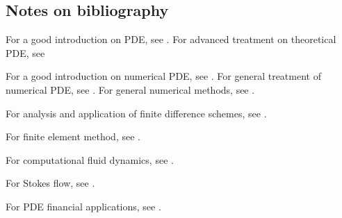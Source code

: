 \begin{refsection}
\fi
\section{Notes on bibliography}

For a good introduction on PDE, see \cite{strauss1992partial}. For advanced treatment on theoretical PDE, see

For a good introduction on numerical PDE, see \cite{holmes2007introduction}.
For general treatment of numerical PDE, see \cite{larsson2008partial}\cite{griffiths2015essential}\cite{leveque2007finite}.
For general numerical methods, see \cite{sauer2012numerical}.

For analysis and application of finite difference schemes, see \cite{strikwerda2004finite}\cite{leveque2007finite}\cite{karniadakis2003parallel}.
 
For finite element method, see \cite{bickford1990first}\cite{larson2013finite}.

For computational fluid dynamics, see \cite{zikanov2010essential}.

For Stokes flow, see \cite{barthes2012microhydrodynamics}.

For PDE financial applications, see \cite{zhu2004derivative}\cite{duan2011handbook}\cite{platen2010numerical}\cite{seydel2006tools}.
\printbibliography
\end{refsection}
